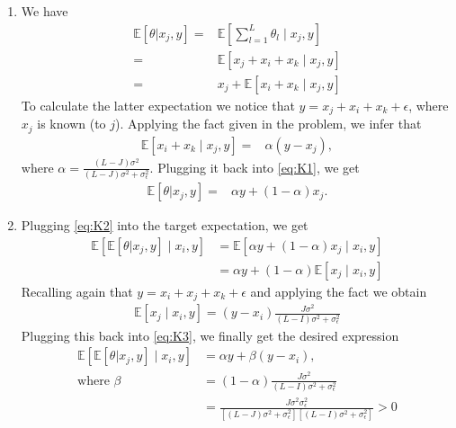 \begin{solution}
	\begin{enumerate}
		\item We have
		\begin{align}
			\mathbb{E}\left[ \theta | x_j, y \right] =& \mathbb{E}\left[ \sum_{l=1}^L \theta_l \mid x_j, y \right] \nonumber
			\\
			=& \mathbb{E}\left[ x_j + x_i + x_k \mid x_j, y \right] \nonumber
			\\
			=& x_j + \mathbb{E}\left[ x_i + x_k \mid x_j, y \right] \label{eq:K1}
		\end{align}
		To calculate the latter expectation we notice that $y = x_j + x_i + x_k + \epsilon$, where $x_j$ is known (to $j$). Applying the fact given in the problem, we infer that
		\begin{align*}
			\mathbb{E}\left[ x_i + x_k \mid x_j, y \right]
			=& \alpha (y-x_j),
		\end{align*}
		where $\alpha = \frac{(L-J)\sigma^2}{(L-J)\sigma^2 + \sigma^2_\epsilon}$.
		Plugging it back into \eqref{eq:K1}, we get
		\begin{align}
			\mathbb{E}\left[ \theta | x_j, y \right] =& \alpha y + (1-\alpha) x_j. \label{eq:K2}
		\end{align}
		
		\item Plugging \eqref{eq:K2} into the target expectation, we get
		\begin{align}
			\mathbb{E} \left[ \mathbb{E}\left[ \theta | x_j, y \right] \mid x_i, y \right]
			&= \mathbb{E} \left[ \alpha y + (1-\alpha) x_j \mid x_i, y \right] \nonumber
			\\
			&= \alpha y + (1-\alpha) \mathbb{E} \left[ x_j \mid x_i, y \right] \label{eq:K3}
		\end{align}
		Recalling again that $y = x_i + x_j + x_k + \epsilon$ and applying the fact we obtain
		\begin{align*}
			\mathbb{E} \left[ x_j \mid x_i, y \right] = (y-x_i) \frac{J\sigma^2}{(L-I)\sigma^2 + \sigma^2_\epsilon}
		\end{align*}
		Plugging this back into \eqref{eq:K3}, we finally get the desired expression 
		\begin{align*}
			\mathbb{E} \left[ \mathbb{E}\left[ \theta | x_j, y \right] \mid x_i, y \right] &= \alpha y + \beta \left(y-x_i\right),
			\\
			\text{where } \beta &= (1-\alpha)\frac{J\sigma^2}{(L-I)\sigma^2 + \sigma^2_\epsilon}
			\\
			&= \frac{ J \sigma^2 \sigma^2_\epsilon}{\left[ (L-J)\sigma^2 + \sigma^2_\epsilon \right] \left[ (L-I)\sigma^2 + \sigma^2_\epsilon \right]} > 0
		\end{align*}
		

\end{enumerate}
\end{solution}
